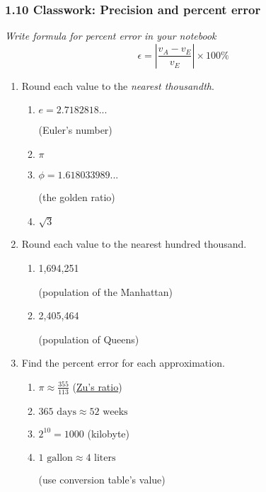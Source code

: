 

\fancyhead[LE]{\thepage}



\subsubsection*{1.10 Classwork: Precision and percent error}
\emph{Write formula for percent error in your notebook}
$$\epsilon = \left|\frac{v_A-v_E}{v_E}\right| \times 100\%$$
\begin{enumerate}
\item Round each value to the \emph{nearest thousandth}.
  \begin{multicols}{2}
    \begin{enumerate}
      \item $e=2.7182818...$ \par (Euler's number)
      \item $\pi$
      \item $\phi = 1.618033989...$ \par (the golden ratio)
      \item $\sqrt{3}$
    \end{enumerate}
  \end{multicols} \bigskip 

\item Round each value to the nearest hundred thousand.
  \begin{multicols}{2}
    \begin{enumerate}
      \item 1,694,251 \par \bigskip (population of the Manhattan)
      \item 2,405,464 \par \bigskip (population of Queens)
    \end{enumerate}
  \end{multicols}

\item Find the percent error for each approximation.
  \begin{multicols}{2}
    \begin{enumerate}[itemsep=4cm]
      \item $\displaystyle \pi \approx \frac{355}{113}$ (\href{https://en.wikipedia.org/wiki/Zu_Chongzhi}{Zu's ratio})
      \item $365 \text{ days} \approx 52 \text{ weeks}$
      \item $2^{10}=1000$ (kilobyte)
      \item $1 \text{ gallon} \approx 4 \text{ liters}$ \par (use conversion table's value)    
    \end{enumerate}
  \end{multicols}


\end{enumerate}
